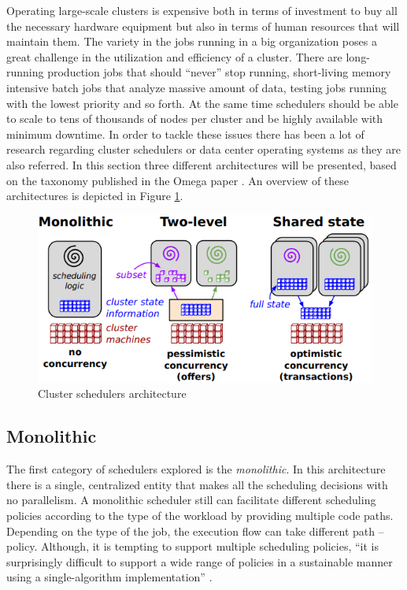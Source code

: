 Operating large-scale clusters is expensive both in terms of
investment to buy all the necessary hardware equipment but also in terms of
human resources that will maintain them. The variety in the jobs
running in a big organization poses a great challenge in the
utilization and efficiency of a cluster. There are long-running
production jobs that should ``never'' stop running, short-living
memory intensive batch jobs that analyze massive amount of data,
testing jobs running with the lowest priority and so forth. At the
same time schedulers should be able to scale to tens of thousands of
nodes per cluster and be highly available with minimum downtime. In order
to tackle these issues there has been a lot of research regarding cluster
schedulers or data center operating systems as they are also
referred. In this section three different architectures will be presented,
based on the taxonomy published
in the Omega paper \cite{41684}. An overview of these architectures is
depicted in Figure \ref{fig:sch_tax}.

\begin{figure}
\centering
\includegraphics[scale=0.6]{resources/images/Background/schedulers_taxonomy.png}
\caption{Cluster schedulers architecture \cite{41684}}
\label{fig:sch_tax}
\end{figure}

\subsection{Monolithic}
\label{ssec:tax_monolithic}
The first category of schedulers explored is the \emph{monolithic}. In
this architecture there is a single, centralized entity that makes all
the scheduling decisions with no parallelism. A monolithic scheduler
still can facilitate different scheduling policies according to the type
of the workload by providing multiple code paths. Depending on the
type of the job, the execution flow can take different path --
policy. Although, it is tempting to support multiple
scheduling policies, ``it is surprisingly difficult to support a wide
range of policies in a sustainable manner using a single-algorithm
implementation'' \cite{41684}.

